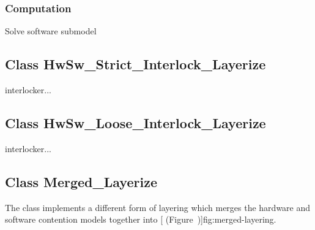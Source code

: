 \subsubsection{Computation}
\begin{description}

\label{sec:hwsw-loose-solveSoftware}
\item[solveSoftware] \texonly{---} Solve software submodel \\

\end{description}

\htmlrule
\subsection{Class HwSw\_Strict\_Interlock\_Layerize}
\label{sec:hwsw-strict-interlock}

interlocker...

\htmlrule
\subsection{Class HwSw\_Loose\_Interlock\_Layerize}
\label{sec:hwsw-loose-interlock}

interlocker...

\htmlrule
\subsection{Class Merged\_Layerize}
\label{sec:merged}

The class  implements a different form of
layering which merges the hardware and software contention models
together into [ (Figure~\Ref)]{fig:merged-layering}.

\begin{figure}[htp]
  \label{fig:merged-layering}
  \begin{center}
  \end{center}
\end{figure}

